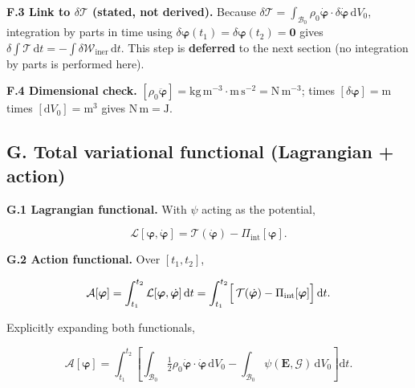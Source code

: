 \documentclass[11pt]{article}
\begin{document}
\textbf{F.3 Link to $\delta\mathcal{T}$ (stated, not derived).} Because $\delta\mathcal{T}=\int_{\mathcal{B}_{0}}\rho_{0}\dot{\boldsymbol{\varphi}}\cdot\delta\dot{\boldsymbol{\varphi}}\,\mathrm{d}V_{0}$, integration by parts in time using $\delta\boldsymbol{\varphi}(t_{1})=\delta\boldsymbol{\varphi}(t_{2})=\mathbf{0}$ gives $\delta\int\mathcal{T}\,\mathrm{d}t=-\int\delta\mathcal{W}_{\mathrm{iner}}\,\mathrm{d}t$. This step is \textbf{deferred} to the next section (no integration by parts is performed here).

\textbf{F.4 Dimensional check.} $[\rho_{0}\ddot{\boldsymbol{\varphi}}]=\mathrm{kg\,m^{-3}}\cdot\mathrm{m\,s^{-2}}=\mathrm{N\,m^{-3}}$; times $[\delta\boldsymbol{\varphi}]=\mathrm{m}$ times $[\mathrm{d}V_{0}]=\mathrm{m^{3}}$ gives $\mathrm{N\,m}=\mathrm{J}$. \checkmark

\subsection{G. Total variational functional (Lagrangian + action)}

\textbf{G.1 Lagrangian functional.} With $\psi$ acting as the potential,

\begin{equation}
\mathcal{L}[\boldsymbol{\varphi},\dot{\boldsymbol{\varphi}}]
= \mathcal{T}(\dot{\boldsymbol{\varphi}})
- \Pi_{\mathrm{int}}[\boldsymbol{\varphi}].
\label{rn:Lagrangian}
\end{equation}

\textbf{G.2 Action functional.} Over $[t_{1},t_{2}]$,

\begin{equation}
\mathcal{A}[\boldsymbol{\varphi}]
= \int_{t_{1}}^{t_{2}}
  \mathcal{L}[\boldsymbol{\varphi},\dot{\boldsymbol{\varphi}}]\,\mathrm{d}t
= \int_{t_{1}}^{t_{2}}
  \Bigl[\,\mathcal{T}(\dot{\boldsymbol{\varphi}})
        -\Pi_{\mathrm{int}}[\boldsymbol{\varphi}]\Bigr]\,\mathrm{d}t.
\label{rn:action}
\end{equation}

Explicitly expanding both functionals,

\begin{equation}
\mathcal{A}[\boldsymbol{\varphi}]
= \int_{t_{1}}^{t_{2}}
  \left[
    \int_{\mathcal{B}_{0}}\tfrac12\rho_{0}\dot{\boldsymbol{\varphi}}\cdot\dot{\boldsymbol{\varphi}}\,\mathrm{d}V_{0}
  - \int_{\mathcal{B}_{0}}\psi(\mathbf{E},\bm{\mathcal{G}})\,\mathrm{d}V_{0}
  \right]\mathrm{d}t.
\label{rn:action_expand}
\end{equation}
\end{document}
